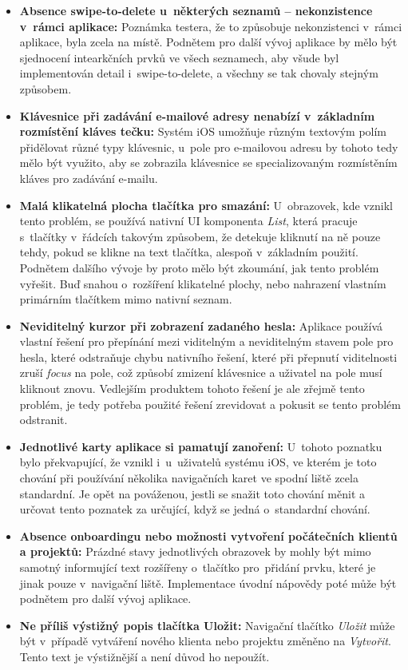 \begin{itemize}
\item\textbf{Absence swipe-to-delete u~některých seznamů – nekonzistence v~rámci aplikace:} Poznámka testera, že to způsobuje nekonzistenci v~rámci aplikace, byla zcela na místě. Podnětem pro další vývoj aplikace by mělo být sjednocení intearkčních prvků ve všech seznamech, aby všude byl implementován detail i~swipe-to-delete, a všechny se tak chovaly stejným způsobem.
\item\textbf{Klávesnice při zadávání e-mailové adresy nenabízí v~základním rozmístění kláves tečku:} Systém iOS umožňuje různým textovým polím přidělovat různé typy klávesnic, u~pole pro e-mailovou adresu by tohoto tedy mělo být využito, aby se zobrazila klávesnice se specializovaným rozmístěním kláves pro zadávání e-mailu.
\item\textbf{Malá klikatelná plocha tlačítka pro smazání:} U~obrazovek, kde vznikl tento problém, se používá nativní UI komponenta \emph{List}, která pracuje s~tlačítky v~řádcích takovým způsobem, že detekuje kliknutí na ně pouze tehdy, pokud se klikne na text tlačítka, alespoň v~základním použití. Podnětem dalšího vývoje by proto mělo být zkoumání, jak tento problém vyřešit. Buď snahou o~rozšíření klikatelné plochy, nebo nahrazení vlastním primárním tlačítkem mimo nativní seznam.
\item\textbf{Neviditelný kurzor při zobrazení zadaného hesla:} Aplikace používá vlastní řešení pro přepínání mezi viditelným a neviditelným stavem pole pro hesla, které odstraňuje chybu nativního řešení, které při přepnutí viditelnosti zruší \emph{focus} na pole, což způsobí zmizení klávesnice a uživatel na pole musí kliknout znovu. Vedlejším produktem tohoto řešení je ale zřejmě tento problém, je tedy potřeba použité řešení zrevidovat a pokusit se tento problém odstranit.
\item\textbf{Jednotlivé karty aplikace si pamatují zanoření:} U~tohoto poznatku bylo překvapující, že vznikl i~u~uživatelů systému iOS, ve kterém je toto chování při používání několika navigačních karet ve spodní liště zcela standardní. Je opět na pováženou, jestli se snažit toto chování měnit a určovat tento poznatek za určující, když se jedná o~standardní chování.
\item\textbf{Absence onboardingu nebo možnosti vytvoření počátečních klientů a projektů:} Prázdné stavy jednotlivých obrazovek by mohly být mimo samotný informující text rozšířeny o~tlačítko pro~přidání prvku, které je jinak pouze v~navigační liště. Implementace úvodní nápovědy poté může být podnětem pro další vývoj aplikace.
\item\textbf{Ne příliš výstižný popis tlačítka Uložit:} Navigační tlačítko \emph{Uložit} může být v~případě vytváření nového klienta nebo projektu změněno na \emph{Vytvořit}. Tento text je výstižnější a není důvod ho nepoužít.

\end{itemize}
